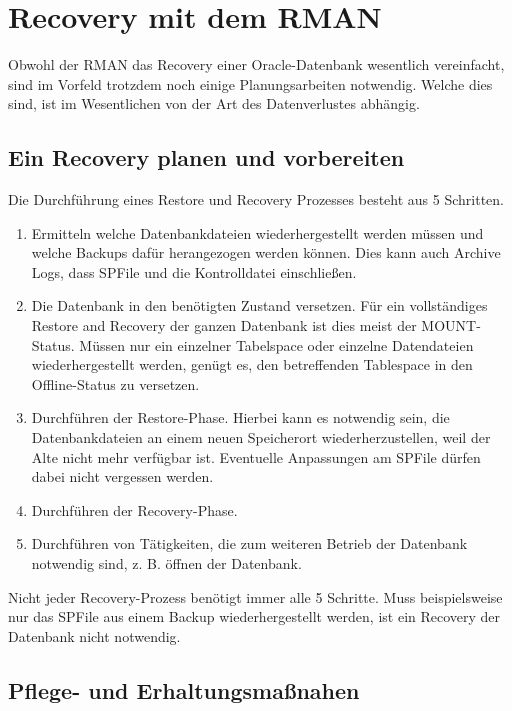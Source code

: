 \chapter{Recovery mit dem RMAN}
  \label{recoverywithrman}
  \chaptertoc{}
  \cleardoubleevenpage
  
      Obwohl der RMAN das Recovery einer Oracle-Datenbank wesentlich vereinfacht, sind im Vorfeld trotzdem noch einige Planungsarbeiten notwendig. Welche dies sind, ist im Wesentlichen von der Art des Datenverlustes abhängig.
    \section{Ein Recovery planen und vorbereiten}
      Die Durchführung eines Restore und Recovery Prozesses besteht aus 5 Schritten.
      \begin{enumerate}
        \item Ermitteln welche Datenbankdateien wiederhergestellt werden müssen und welche Backups dafür herangezogen werden können. Dies kann auch Archive Logs, dass SPFile und die Kontrolldatei einschließen.
        \item Die Datenbank in den benötigten Zustand versetzen. Für ein vollständiges Restore and Recovery der ganzen Datenbank ist dies meist der MOUNT-Status. Müssen nur ein einzelner Tabelspace oder einzelne Datendateien wiederhergestellt werden, genügt es, den betreffenden Tablespace in den Offline-Status zu versetzen.
        \item Durchführen der Restore-Phase. Hierbei kann es notwendig sein, die Datenbankdateien an einem neuen Speicherort wiederherzustellen, weil der Alte nicht mehr verfügbar ist. Eventuelle Anpassungen am SPFile dürfen dabei nicht vergessen werden.
        \item Durchführen der Recovery-Phase.
        \item Durchführen von Tätigkeiten, die zum weiteren Betrieb der Datenbank notwendig sind, z. B. öffnen der Datenbank.
      \end{enumerate}
      Nicht jeder Recovery-Prozess benötigt immer alle 5 Schritte. Muss beispielsweise nur das SPFile aus einem Backup wiederhergestellt werden, ist ein Recovery der Datenbank nicht notwendig.
    \section{Pflege- und Erhaltungsmaßnahen}

